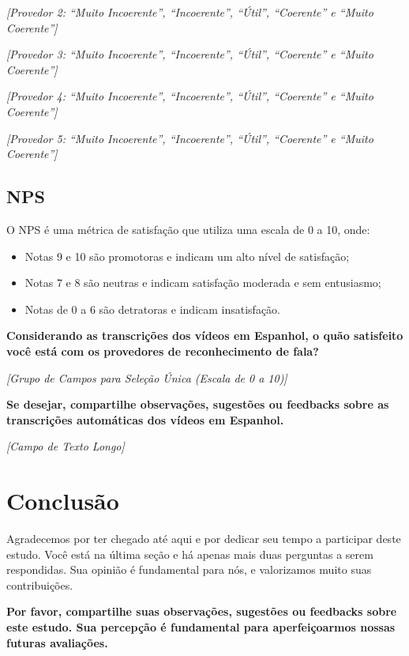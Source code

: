 \noindent
\textit{[Provedor 2: ``Muito Incoerente'', ``Incoerente'', ``Útil'', ``Coerente'' e ``Muito Coerente'']}

\noindent
\textit{[Provedor 3: ``Muito Incoerente'', ``Incoerente'', ``Útil'', ``Coerente'' e ``Muito Coerente'']}

\noindent
\textit{[Provedor 4: ``Muito Incoerente'', ``Incoerente'', ``Útil'', ``Coerente'' e ``Muito Coerente'']}

\noindent
\textit{[Provedor 5: ``Muito Incoerente'', ``Incoerente'', ``Útil'', ``Coerente'' e ``Muito Coerente'']}

\subsection{NPS}

\noindent
O NPS é uma métrica de satisfação que utiliza uma escala de 0 a 10, onde: 

\begin{itemize}
    \item Notas 9 e 10 são promotoras e indicam um alto nível de satisfação; 
    \item Notas 7 e 8 são neutras e indicam satisfação moderada e sem entusiasmo; 
    \item Notas de 0 a 6 são detratoras e indicam insatisfação.
\end{itemize}

\noindent
\textbf{Considerando as transcrições dos vídeos em Espanhol, o quão satisfeito você está com os provedores de reconhecimento de fala?}

\noindent
\textit{[Grupo de Campos para Seleção Única (Escala de 0 a 10)]}

\noindent
\textbf{Se desejar, compartilhe observações, sugestões ou feedbacks sobre as transcrições automáticas dos vídeos em Espanhol.}

\noindent
\textit{[Campo de Texto Longo]}

\section{Conclusão}

\noindent
Agradecemos por ter chegado até aqui e por dedicar seu tempo a participar deste estudo. 
Você está na última seção e há apenas mais duas perguntas a serem respondidas. Sua 
opinião é fundamental para nós, e valorizamos muito suas contribuições.

\noindent
\textbf{Por favor, compartilhe suas observações, sugestões ou feedbacks sobre este
estudo. Sua percepção é fundamental para aperfeiçoarmos nossas futuras
avaliações.}

